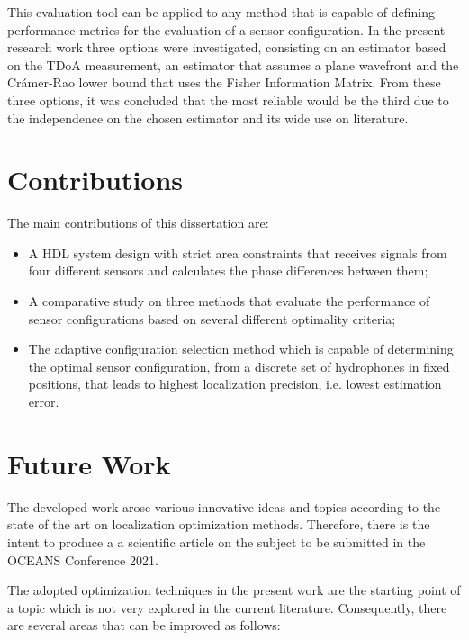This evaluation tool can be applied to any method that is capable of defining performance metrics for the evaluation of a sensor configuration. In the present research work three options were investigated, consisting on an estimator based on the TDoA measurement, an estimator that assumes a plane wavefront and the Crámer-Rao lower bound that uses the Fisher Information Matrix. From these three options, it was concluded that the most reliable would be the third due to the independence on the chosen estimator and its wide use on literature.

\section{Contributions }

The main contributions of this dissertation are: 
\begin{itemize}
	\item A HDL system design with strict area constraints that receives signals from four different sensors and calculates the phase differences between them;
	\item A comparative study on three methods that evaluate the performance of sensor configurations based on several different optimality criteria;
	\item The adaptive configuration selection method which is capable of determining the optimal sensor configuration, from a discrete set of hydrophones in fixed positions, that leads to highest localization precision, i.e. lowest estimation error.
\end{itemize}


\section{Future Work}

The developed work arose various innovative ideas and topics according to the state of the art on localization optimization methods. Therefore, there is the intent to produce a a scientific article on the subject to be submitted in the OCEANS Conference 2021.

The adopted optimization techniques in the present work are the starting point of a topic which is not very explored in the current literature. Consequently, there are several areas that can be improved as follows:

